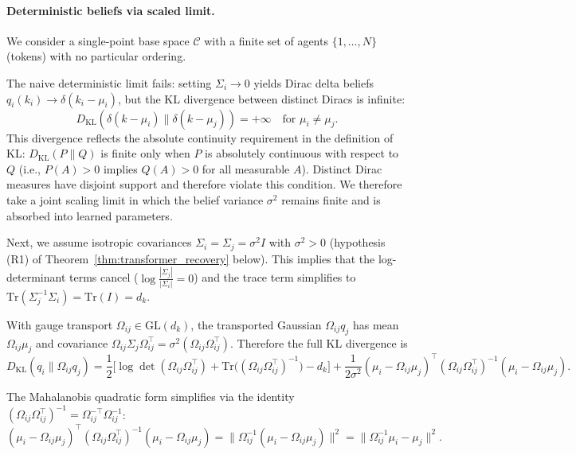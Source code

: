 \documentclass[11pt]{article}
\begin{document}
\paragraph{Deterministic beliefs via scaled limit.}

We consider a single-point base space $\mathcal{C}$ with a finite set of agents $\{1,\dots,N\}$ (tokens) with no particular ordering.

The naive deterministic limit fails: setting $\Sigma_i \to 0$ yields Dirac delta beliefs $q_i(k_i) \to \delta(k_i - \mu_i)$, but the KL divergence between distinct Diracs is infinite:
\begin{equation}
D_{\mathrm{KL}}(\delta(k - \mu_i) \| \delta(k - \mu_j)) = +\infty \quad \text{for } \mu_i \neq \mu_j.
\label{eq:dirac_kl}
\end{equation}
This divergence reflects the absolute continuity requirement in the definition of KL: $D_{\mathrm{KL}}(P \| Q)$ is finite only when $P$ is absolutely continuous with respect to $Q$ (i.e., $P(A) > 0$ implies $Q(A) > 0$ for all measurable $A$). Distinct Dirac measures have disjoint support and therefore violate this condition. We therefore take a joint scaling limit in which the belief variance $\sigma^2$ remains finite and is absorbed into learned parameters.

Next, we assume isotropic covariances $\Sigma_i = \Sigma_j = \sigma^2 I$ with $\sigma^2 > 0$ (hypothesis (R1) of Theorem~\ref{thm:transformer_recovery} below). This implies that the log-determinant terms cancel ($\log\frac{|\Sigma_j|}{|\Sigma_i|} = 0$) and the trace term simplifies to $\mathrm{Tr}(\Sigma_j^{-1}\Sigma_i) = \mathrm{Tr}(I) = d_k$.

With gauge transport $\Omega_{ij} \in \mathrm{GL}(d_k)$, the transported Gaussian $\Omega_{ij}q_j$ has mean $\Omega_{ij}\mu_j$ and covariance $\Omega_{ij}\Sigma_j\Omega_{ij}^\top = \sigma^2(\Omega_{ij}\Omega_{ij}^\top)$. Therefore the full KL divergence is
\begin{equation}
D_{\mathrm{KL}}(q_i \| \Omega_{ij}q_j) = \frac{1}{2}\Big[\log\det(\Omega_{ij}\Omega_{ij}^\top) + \mathrm{Tr}\big((\Omega_{ij}\Omega_{ij}^\top)^{-1}\big) - d_k\Big] + \frac{1}{2\sigma^2}(\mu_i - \Omega_{ij}\mu_j)^\top(\Omega_{ij}\Omega_{ij}^\top)^{-1}(\mu_i - \Omega_{ij}\mu_j).
\end{equation}

The Mahalanobis quadratic form simplifies via the identity $(\Omega_{ij}\Omega_{ij}^\top)^{-1} = \Omega_{ij}^{-\top}\Omega_{ij}^{-1}$:
\begin{equation}
(\mu_i - \Omega_{ij}\mu_j)^\top(\Omega_{ij}\Omega_{ij}^\top)^{-1}(\mu_i - \Omega_{ij}\mu_j) = \|\Omega_{ij}^{-1}(\mu_i - \Omega_{ij}\mu_j)\|^2 = \|\Omega_{ij}^{-1}\mu_i - \mu_j\|^2.
\label{eq:mahalanobis_identity}
\end{equation}
\end{document}
